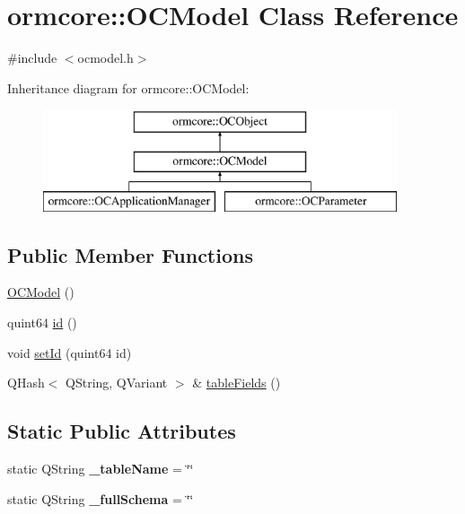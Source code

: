 \hypertarget{classormcore_1_1_o_c_model}{
\section{ormcore\-:\-:\-O\-C\-Model \-Class \-Reference}
\label{classormcore_1_1_o_c_model}
}


{\ttfamily \#include $<$ocmodel.\-h$>$}

\-Inheritance diagram for ormcore\-:\-:\-O\-C\-Model\-:\begin{figure}[H]
\begin{center}
\leavevmode
\includegraphics[height=3.000000cm]{classormcore_1_1_o_c_model}
\end{center}
\end{figure}
\subsection*{\-Public \-Member \-Functions}
\begin{DoxyCompactItemize}
\item 
\hyperlink{classormcore_1_1_o_c_model_af71a4d619bede3a8701c273ca0558c29}{\-O\-C\-Model} ()
\item 
quint64 \hyperlink{classormcore_1_1_o_c_model_a5ea297130eecaa9bc7eab2e0c4a743a1}{id} ()
\item 
void \hyperlink{classormcore_1_1_o_c_model_ac8287eb78aa18392a0231b71fa66b450}{set\-Id} (quint64 id)
\item 
\-Q\-Hash$<$ \-Q\-String, \-Q\-Variant $>$ \& \hyperlink{classormcore_1_1_o_c_model_aa58346d1a59a995e598389d8b8ea2b5b}{table\-Fields} ()
\end{DoxyCompactItemize}
\subsection*{\-Static \-Public \-Attributes}
\begin{DoxyCompactItemize}
\item 
\hypertarget{classormcore_1_1_o_c_model_adbcc25b105925536f1eb1c1b6d96d4db}{
static \-Q\-String {\bfseries \-\_\-table\-Name} = \char`\"{}\char`\"{}}
\label{classormcore_1_1_o_c_model_adbcc25b105925536f1eb1c1b6d96d4db}

\item 
\hypertarget{classormcore_1_1_o_c_model_adc7c45bf12c6ab0b5b025038d9b3817d}{
static \-Q\-String {\bfseries \-\_\-full\-Schema} = \char`\"{}\char`\"{}}
\label{classormcore_1_1_o_c_model_adc7c45bf12c6ab0b5b025038d9b3817d}

\end{DoxyCompactItemize}


